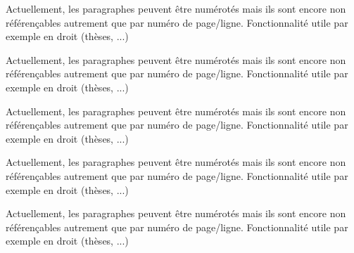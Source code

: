 \documentclass{article}
\begin{document}
\numberpstarttrue
\beginnumbering
\pstart
Actuellement, les paragraphes peuvent être numérotés mais ils sont encore non référençables autrement que par numéro de page/ligne. Fonctionnalité utile par exemple en droit (thèses, ...)
\pend

\pstart
Actuellement, les paragraphes peuvent être numérotés mais ils sont encore non référençables autrement que par numéro de page/ligne. Fonctionnalité utile par exemple en droit (thèses, ...)
\pend

\pstart
Actuellement, les paragraphes peuvent être numérotés mais ils sont encore non référençables autrement que par numéro de page/ligne. Fonctionnalité utile par exemple en droit (thèses, ...)
\pend

\pstart
Actuellement, les paragraphes peuvent être numérotés mais ils sont encore non référençables autrement que par numéro de page/ligne. Fonctionnalité utile par exemple en droit (thèses, ...)
\pend

\pstart
Actuellement, les paragraphes peuvent être numérotés mais ils sont encore non référençables autrement que par numéro de page/ligne. Fonctionnalité utile par exemple en droit (thèses, ...)
\pend
\endnumbering
\end{document}
